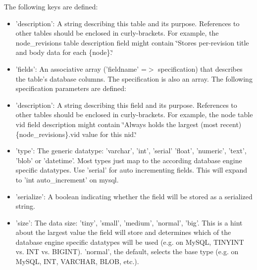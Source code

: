 The following keys are defined:

\begin{itemize}
\item 'description': A string describing this table and its purpose. References to other tables should be enclosed in curly-brackets. For example, the node\_\-revisions table description field might contain \char`\"{}Stores per-revision title and body data for each \{node\}.\char`\"{}\item 'fields': An associative array ('fieldname' =$>$ specification) that describes the table's database columns. The specification is also an array. The following specification parameters are defined:\end{itemize}


\begin{itemize}
\item 'description': A string describing this field and its purpose. References to other tables should be enclosed in curly-brackets. For example, the node table vid field description might contain \char`\"{}Always holds the largest (most recent) \{node\_\-revisions\}.vid value for this nid.\char`\"{}\item 'type': The generic datatype: 'varchar', 'int', 'serial' 'float', 'numeric', 'text', 'blob' or 'datetime'. Most types just map to the according database engine specific datatypes. Use 'serial' for auto incrementing fields. This will expand to 'int auto\_\-increment' on mysql.\item 'serialize': A boolean indicating whether the field will be stored as a serialized string.\item 'size': The data size: 'tiny', 'small', 'medium', 'normal', 'big'. This is a hint about the largest value the field will store and determines which of the database engine specific datatypes will be used (e.g. on MySQL, TINYINT vs. INT vs. BIGINT). 'normal', the default, selects the base type (e.g. on MySQL, INT, VARCHAR, BLOB, etc.).\end{itemize}


